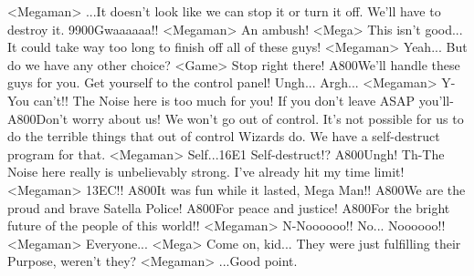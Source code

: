 <Megaman> ...It doesn't look like we can stop it or turn it off. 
We'll have to destroy it. 
{99}{00}Gwaaaaaa!! 
<Megaman> An ambush! 
<Mega> This isn't good... 
It could take way too long to finish off all of these guys! 
<Megaman> Yeah... 
But do we have any other choice? 
<Game> Stop right there! 
{A8}{00}We'll handle these guys for you. 
Get yourself to the control panel! 
Ungh... Argh... 
<Megaman> Y-You can't!! 
The Noise here is too much for you! 
If you don't leave ASAP you'll- 
{A8}{00}Don't worry about us! 
We won't go out of control. 
It's not possible for us to do the terrible things that out of control Wizards do. 
We have a self-destruct program for that. 
<Megaman> Self...{16}{E1} Self-destruct!? 
{A8}{00}Ungh! 
Th-The Noise here really is unbelievably strong. 
I've already hit my time limit! 
<Megaman> {13}{EC}!! 
{A8}{00}It was fun while it lasted, Mega Man!! 
{A8}{00}We are the proud and brave Satella Police! 
{A8}{00}For peace and justice! 
{A8}{00}For the bright future of the people of this world!! 
<Megaman> N-Noooooo!! 
No... 
Noooooo!! 
<Megaman> Everyone... 
<Mega> Come on, kid... 
They were just fulfilling their Purpose, weren't they? 
<Megaman> ...Good point. 
